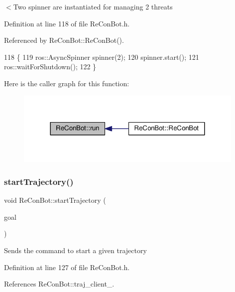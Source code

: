$<$Two spinner are instantiated for managing 2 threats 

Definition at line 118 of file Re\+Con\+Bot.\+h.



Referenced by Re\+Con\+Bot\+::\+Re\+Con\+Bot().


\begin{DoxyCode}
118                   \{
119     ros::AsyncSpinner spinner(2);
120     spinner.start();
121     ros::waitForShutdown();
122 \}
\end{DoxyCode}
Here is the caller graph for this function\+:
\nopagebreak
\begin{figure}[H]
\begin{center}
\leavevmode
\includegraphics[width=312pt]{d9/d0b/class_re_con_bot_ac264f3082203c3b2ef13b6f353476ca7_icgraph}
\end{center}
\end{figure}
\mbox{\label{class_re_con_bot_ade3eb1a4752d45659321209f5730cef3}} 
\subsubsection{\texorpdfstring{start\+Trajectory()}{startTrajectory()}}
{\footnotesize\ttfamily void Re\+Con\+Bot\+::start\+Trajectory (\begin{DoxyParamCaption}\item[{control\+\_\+msgs\+::\+Follow\+Joint\+Trajectory\+Goal}]{goal }\end{DoxyParamCaption})\hspace{0.3cm}{\ttfamily [inherited]}}

Sends the command to start a given trajectory 

Definition at line 127 of file Re\+Con\+Bot.\+h.



References Re\+Con\+Bot\+::traj\+\_\+client\+\_\+.



